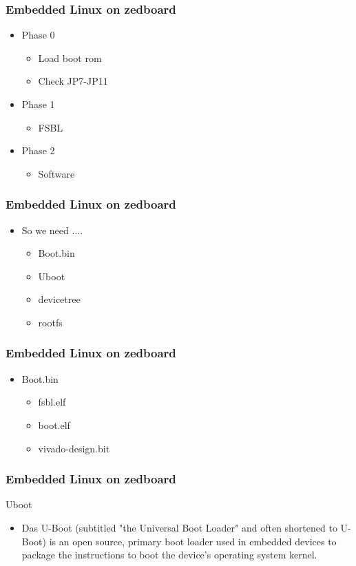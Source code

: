 \documentclass{beamer}
\begin{document}
\begin{frame}
\frametitle{Embedded Linux on zedboard}
\begin{itemize}
\item Phase 0
	\begin{itemize}
	\item Load boot rom
	\item Check JP7-JP11
	\end{itemize}
\item Phase 1
	\begin{itemize}
	\item FSBL
	\end{itemize}
\item Phase 2
	\begin{itemize}
	\item Software 
	\end{itemize}
\end{itemize}
\end{frame}


\begin{frame}
\frametitle{Embedded Linux on zedboard}
\begin{itemize}
\item So we need ....
	\begin{itemize}
	\item Boot.bin
	\item Uboot
	\item devicetree
	\item rootfs
	\end{itemize}
\end{itemize}
\end{frame}

\begin{frame}
\frametitle{Embedded Linux on zedboard}
\begin{itemize}
\item Boot.bin
	\begin{itemize}
	\item fsbl.elf
	\item boot.elf
	\item vivado-design.bit
	\end{itemize}
\end{itemize}
\end{frame}

\begin{frame}
\frametitle{Embedded Linux on zedboard}
\centering Uboot
\centering \\
\begin{itemize}
	\item Das U-Boot (subtitled "the Universal Boot Loader" and often shortened to U-Boot) is an open source, primary boot loader used in embedded devices to package the instructions to boot the device's operating system kernel.
\end{itemize}
\end{frame}
\end{document}
